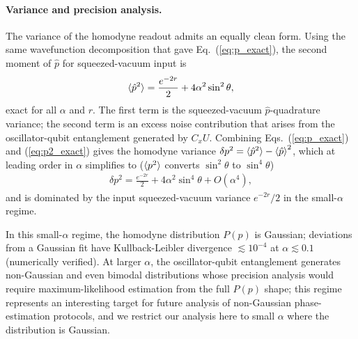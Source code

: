 \documentclass[aps,prx,showpacs,notitlepage,twocolumn,superscriptaddress,nofootinbib,preprintnumbers,floatfix,10pt, longbibliography]{revtex4-2}
\begin{document}
{\paragraph{Variance and precision analysis.}
The variance of the homodyne readout admits an equally clean form.
Using the same wavefunction decomposition that gave
Eq.~(\ref{eq:p_exact}), the second moment of $\hat{p}$ for
squeezed-vacuum input is
\begin{align}
  \braket{\hat{p}^2} = \frac{e^{-2r}}{2} + 4\alpha^2\sin^2\theta,
  \label{eq:p2_exact}
\end{align}
exact for all $\alpha$ and $r$. The first term is the squeezed-vacuum
$\hat{p}$-quadrature variance; the second term is an excess noise
contribution that arises from the oscillator-qubit entanglement
generated by $C_xU$. Combining Eqs.~(\ref{eq:p_exact}) and
(\ref{eq:p2_exact}) gives the homodyne variance
$\delta p^2 = \braket{\hat{p}^2}-\braket{\hat{p}}^2$, which
at leading order in $\alpha$ simplifies to ($\braket{p^2}$ converts $\sin^2\theta$ to $\sin^4\theta$)
\begin{align}
  \delta p^2 = \frac{e^{-2r}}{2}
    + 4\alpha^2\sin^4\theta + O(\alpha^4),
\end{align}
and is dominated by the input squeezed-vacuum variance $e^{-2r}/2$ in
the small-$\alpha$ regime.

In this small-$\alpha$ regime, the homodyne distribution $P(p)$ is
Gaussian; deviations from a Gaussian fit have Kullback-Leibler
divergence $\lesssim 10^{-4}$ at $\alpha\lesssim 0.1$ (numerically
verified). At larger $\alpha$, the oscillator-qubit entanglement
generates non-Gaussian and even bimodal distributions whose precision
analysis would require maximum-likelihood estimation from the full
$P(p)$ shape; this regime represents an interesting target for future
analysis of non-Gaussian phase-estimation protocols, and we restrict
our analysis here to small $\alpha$ where the distribution is
Gaussian.

}
\end{document}
